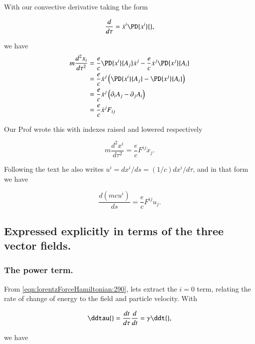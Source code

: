 With our convective derivative taking the form

\begin{equation}\label{eqn:lorentzForceHamiltonian:270}
\frac{d}{d\tau} = \dot{x}^i \PD{x^i}{},
\end{equation}

we have
\begin{align*}
m \frac{d^2 x_i}{d\tau^2} 
&= 
\frac{e}{c} \PD{x^i}{A_j} \dot{x}^j
- 
\frac{e}{c} 
\dot{x}^j 
\PD{x^j}{A_i} \\
&=
\frac{e}{c} 
\dot{x}^j \left( 
\PD{x^i}{A_j} 
-\PD{x^j}{A_i} 
\right) \\
&=
\frac{e}{c} 
\dot{x}^j \left( \partial_i A_j - \partial_j A_i
\right) \\
&=
\frac{e}{c} 
\dot{x}^j F_{ij}
\end{align*}

Our Prof wrote this with indexes raised and lowered respectively

\begin{equation}\label{eqn:lorentzForceHamiltonian:280}
m \frac{d^2 x^i}{d\tau^2} = \frac{e}{c} F^{ij} \dot{x}_j .
\end{equation}

Following the text \citep{landau1980classical} he also writes $u^i = dx^i/ds = (1/c) dx^i/d\tau$, and in that form we have

\begin{equation}\label{eqn:lorentzForceHamiltonian:290}
\frac{d (m c u^i)}{ds} = \frac{e}{c} F^{ij} u_j.
\end{equation}

\subsection{Expressed explicitly in terms of the three vector fields.}
\subsubsection{The power term.}

From \ref{eqn:lorentzForceHamiltonian:290}, lets extract the $i=0$ term, relating the rate of change of energy to the field and particle velocity.  With

\begin{equation}\label{eqn:lorentzForceHamiltonian:300}
\ddtau{} = \frac{dt}{d\tau} \frac{d}{dt} = \gamma \ddt{},
\end{equation}

we have

